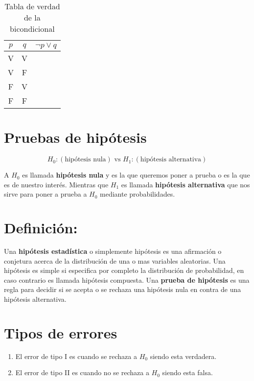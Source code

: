 \documentclass{assignment}
\begin{document}
\begin{table}[h]
    \centering
    \begin{tabular}{|c|c|c|}
    \hline
    $p$  & $q$ & $\neg p  \vee  q$   \\
    \hline
    V  & V &    \\
    \hline
    V  & F &    \\
    \hline
    F  & V &    \\
    \hline
    F  & F &   \\
    \hline
    \end{tabular}
    \caption{Tabla de verdad de la bicondicional}

\end{table}

\section{Pruebas de hipótesis}

\[
H_0: (\text{hipótesis nula}) \text{ vs } H_1: (\text{hipótesis alternativa})
\]

A $H_0$ es llamada \textbf{hipótesis nula} y es la que queremos poner a prueba o es la que es de nuestro interés. Mientras que $H_1$ es llamada \textbf{hipótesis alternativa} que nos sirve para poner a prueba a $H_0$ mediante probabilidades. 

\section{Definición:}
Una \textbf{hipótesis estadística} o simplemente hipótesis es una afirmación o conjetura acerca de la distribución de una o mas variables aleatorias. Una hipótesis es simple si especifica por completo la distribución de probabilidad, en caso contrario es llamada hipótesis compuesta. Una \textbf{prueba de hipótesis} es una regla para decidir si se acepta o se rechaza una hipótesis nula en contra de una hipótesis alternativa.  
 
\section{Tipos de errores}
\begin{enumerate}
    \item El error de tipo I es cuando se rechaza a $H_0$ siendo esta verdadera.
    \item El error de tipo II es cuando no se rechaza a $H_0$ siendo esta falsa.
\end{enumerate}
\end{document}
